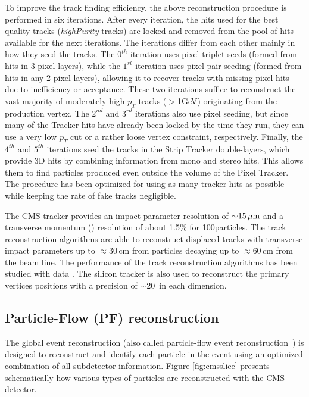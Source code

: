 To improve the track finding efficiency, the above reconstruction procedure is
performed in six iterations. After every iteration, the hits
used for the best quality tracks (\textit{highPurity} tracks) are
locked and removed from the pool of hits available for the next iterations.
The iterations differ from each other mainly in how they
seed the tracks.
 The $0^{th}$ iteration uses pixel-triplet seeds (formed from
hits in 3 pixel layers), while the $1^{st}$ iteration uses pixel-pair seeding
(formed from hits in any 2 pixel layers), allowing it to recover tracks with
missing pixel hits due to inefficiency or acceptance. These two iterations
suffice to reconstruct the vast majority of moderately high $p_T$ tracks ($>$1GeV)
originating from the production vertex. The $2^{nd}$ and $3^{rd}$ iterations
also use pixel seeding, but since many of the Tracker hits have already been
locked by the time they run, they can use a very low $p_T$ cut or a rather
loose vertex constraint, respectively. Finally, the $4^{th}$ and $5^{th}$
iterations seed the tracks in the Strip Tracker double-layers, which provide 3D
hits by combining information from mono and stereo hits. This allows them to
find particles produced even outside the volume of the Pixel Tracker. The procedure has been optimized for using as
many tracker hits as possible while keeping the rate of fake tracks negligible.

The CMS tracker provides an impact parameter resolution of ${\sim}15\,\mu\text{m}$ and a transverse momentum (\pt) resolution of about 1.5\% for 100\GeV particles. 
The track reconstruction algorithms are able to reconstruct displaced tracks with transverse impact
parameters up to ${\approx}30$\,cm from particles decaying up to ${\approx}60$\,cm from the beam line.  The
performance of the track reconstruction algorithms has been studied with data
\cite{Khachatryan:2010pw}. 
The silicon
tracker is also used to reconstruct the primary vertices positions with a
precision of ${\sim}20$~\mum in each dimension.

\subsection{Particle-Flow (PF) reconstruction}

The global event reconstruction (also called particle-flow event reconstruction~\cite{CMS-PAS-PFT-09-001,CMS-PAS-PFT-10-001}) is designed to reconstruct and identify each particle in the event using an optimized combination of all subdetector information.
Figure \ref{fig:cmsslice} presents schematically how various types of particles are reconstructed
with the CMS detector.

